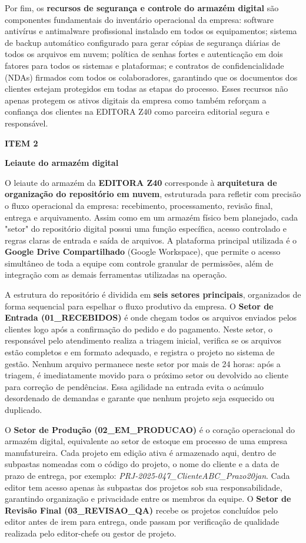 \documentclass[10pt,a4paper]{article}
\newcommand{\labelfont}{\fontsize{5.8}{7.5}\selectfont\bfseries\addfontfeatures{LetterSpace=15}}
\newcommand{\headingfont}{\fontsize{9.8}{12}\selectfont\bfseries\color{navy}}
\newcommand{\separador}{\vspace{16pt}{\color{rulegray}\rule{\linewidth}{0.6pt}}\vspace{10pt}}
\newcommand{\itemh}[2]{\needspace{6\baselineskip}%
  {\labelfont\color{graylab}ITEM #1}\par\vspace{5pt}%
  {\headingfont #2}\par\vspace{8pt}}
\begin{document}
Por fim, os \textbf{recursos de segurança e controle do armazém digital} são componentes fundamentais do inventário operacional da empresa: software antivírus e antimalware profissional instalado em todos os equipamentos; sistema de backup automático configurado para gerar cópias de segurança diárias de todos os arquivos em nuvem; política de senhas fortes e autenticação em dois fatores para todos os sistemas e plataformas; e contratos de confidencialidade (NDAs) firmados com todos os colaboradores, garantindo que os documentos dos clientes estejam protegidos em todas as etapas do processo. Esses recursos não apenas protegem os ativos digitais da empresa como também reforçam a confiança dos clientes na EDITORA Z40 como parceira editorial segura e responsável.

\separador
\itemh{2}{Leiaute do armazém digital}

O leiaute do armazém da \textbf{EDITORA Z40} corresponde à \textbf{arquitetura de organização do repositório em nuvem}, estruturada para refletir com precisão o fluxo operacional da empresa: recebimento, processamento, revisão final, entrega e arquivamento. Assim como em um armazém físico bem planejado, cada "setor" do repositório digital possui uma função específica, acesso controlado e regras claras de entrada e saída de arquivos. A plataforma principal utilizada é o \textbf{Google Drive Compartilhado} (Google Workspace), que permite o acesso simultâneo de toda a equipe com controle granular de permissões, além de integração com as demais ferramentas utilizadas na operação.

A estrutura do repositório é dividida em \textbf{seis setores principais}, organizados de forma sequencial para espelhar o fluxo produtivo da empresa. O \textbf{Setor de Entrada (01\_RECEBIDOS)} é onde chegam todos os arquivos enviados pelos clientes logo após a confirmação do pedido e do pagamento. Neste setor, o responsável pelo atendimento realiza a triagem inicial, verifica se os arquivos estão completos e em formato adequado, e registra o projeto no sistema de gestão. Nenhum arquivo permanece neste setor por mais de 24 horas: após a triagem, é imediatamente movido para o próximo setor ou devolvido ao cliente para correção de pendências. Essa agilidade na entrada evita o acúmulo desordenado de demandas e garante que nenhum projeto seja esquecido ou duplicado.

O \textbf{Setor de Produção (02\_EM\_PRODUCAO)} é o coração operacional do armazém digital, equivalente ao setor de estoque em processo de uma empresa manufatureira. Cada projeto em edição ativa é armazenado aqui, dentro de subpastas nomeadas com o código do projeto, o nome do cliente e a data de prazo de entrega, por exemplo: \emph{PRJ-2025-047\_ClienteABC\_Prazo20jan}. Cada editor tem acesso apenas às subpastas dos projetos sob sua responsabilidade, garantindo organização e privacidade entre os membros da equipe. O \textbf{Setor de Revisão Final (03\_REVISAO\_QA)} recebe os projetos concluídos pelo editor antes de irem para entrega, onde passam por verificação de qualidade realizada pelo editor-chefe ou gestor de projeto.
\end{document}
